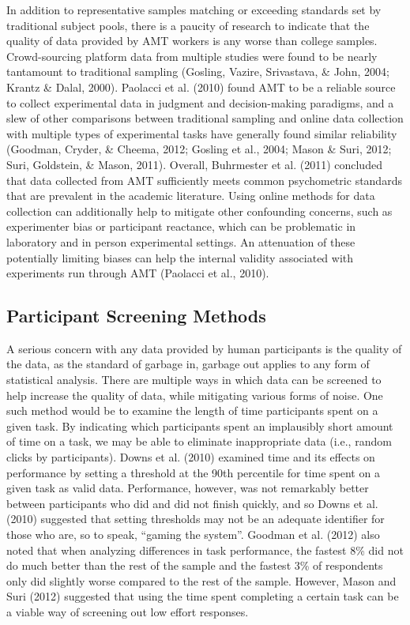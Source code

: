 \documentclass[english,man]{apa6}
\theoremstyle{definition}
\theoremstyle{definition}
\theoremstyle{definition}
\theoremstyle{remark}
\begin{document}
In addition to representative samples matching or exceeding standards
set by traditional subject pools, there is a paucity of research to
indicate that the quality of data provided by AMT workers is any worse
than college samples. Crowd-sourcing platform data from multiple studies
were found to be nearly tantamount to traditional sampling (Gosling,
Vazire, Srivastava, \& John, 2004; Krantz \& Dalal, 2000). Paolacci et
al. (2010) found AMT to be a reliable source to collect experimental
data in judgment and decision-making paradigms, and a slew of other
comparisons between traditional sampling and online data collection with
multiple types of experimental tasks have generally found similar
reliability (Goodman, Cryder, \& Cheema, 2012; Gosling et al., 2004;
Mason \& Suri, 2012; Suri, Goldstein, \& Mason, 2011). Overall,
Buhrmester et al. (2011) concluded that data collected from AMT
sufficiently meets common psychometric standards that are prevalent in
the academic literature. Using online methods for data collection can
additionally help to mitigate other confounding concerns, such as
experimenter bias or participant reactance, which can be problematic in
laboratory and in person experimental settings. An attenuation of these
potentially limiting biases can help the internal validity associated
with experiments run through AMT (Paolacci et al., 2010).

\subsection{Participant Screening
Methods}\label{participant-screening-methods}

A serious concern with any data provided by human participants is the
quality of the data, as the standard of garbage in, garbage out applies
to any form of statistical analysis. There are multiple ways in which
data can be screened to help increase the quality of data, while
mitigating various forms of noise. One such method would be to examine
the length of time participants spent on a given task. By indicating
which participants spent an implausibly short amount of time on a task,
we may be able to eliminate inappropriate data (i.e., random clicks by
participants). Downs et al. (2010) examined time and its effects on
performance by setting a threshold at the 90th percentile for time spent
on a given task as valid data. Performance, however, was not remarkably
better between participants who did and did not finish quickly, and so
Downs et al. (2010) suggested that setting thresholds may not be an
adequate identifier for those who are, so to speak, \enquote{gaming the
system}. Goodman et al. (2012) also noted that when analyzing
differences in task performance, the fastest 8\% did not do much better
than the rest of the sample and the fastest 3\% of respondents only did
slightly worse compared to the rest of the sample. However, Mason and
Suri (2012) suggested that using the time spent completing a certain
task can be a viable way of screening out low effort responses.
\end{document}
